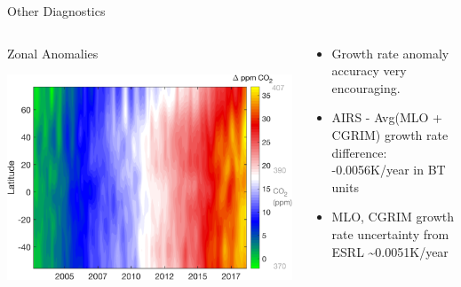 \documentclass[10pt,t]{beamer}
\begin{document}
\begin{frame}[label={sec:org0d9bc5d}]{Other \cd Diagnostics}
\vspace{-0.2in}

\begin{columns}
\begin{column}{0.5\columnwidth}
\begin{block}{\footnotesize Zonal Anomalies}
\vspace{-0.1in}
\begin{center}
\includegraphics[width=0.9\linewidth]{./Figs/Png/co2_anom_image_lat_vs_time.png}
\end{center}
\end{block}
\end{column}

\begin{column}{0.5\columnwidth}
\begin{block}{}
\vspace{-0.2in}
\begin{footnotesize}
\begin{itemize}
\item Growth rate anomaly accuracy very encouraging.
\item AIRS - Avg(MLO + CGRIM) growth rate difference: -0.0056K/year in BT units
\item MLO, CGRIM growth rate uncertainty from ESRL \textasciitilde{}0.0051K/year
\end{itemize}
\end{footnotesize}
\end{block}
\end{column}
\end{columns}
\end{frame}
\end{document}
